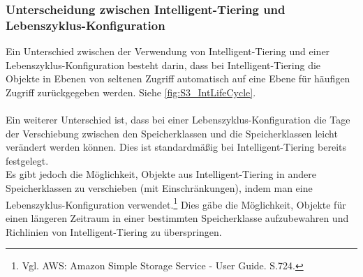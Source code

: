 \subsubsection*{Unterscheidung zwischen Intelligent-Tiering und Lebenszyklus-Konfiguration}%
Ein Unterschied zwischen der Verwendung von Intelligent-Tiering und einer Lebenszyklus-Konfiguration besteht darin, dass bei Intelligent-Tiering die Objekte in Ebenen von seltenen Zugriff automatisch auf eine Ebene für häufigen Zugriff zurückgegeben werden. Siehe \autoref{fig:S3_IntLifeCycle}.
\\\\
Ein weiterer Unterschied ist, dass bei einer Lebenszyklus-Konfiguration die Tage der Verschiebung zwischen den Speicherklassen und die Speicherklassen leicht verändert werden können. Dies ist standardmäßig bei Intelligent-Tiering bereits festgelegt. %
\\
Es gibt jedoch die Möglichkeit, Objekte aus Intelligent-Tiering in andere Speicherklassen zu verschieben (mit Einschränkungen), indem man eine Lebenszyklus-Konfiguration verwendet.\footnote{Vgl. AWS: Amazon Simple Storage Service - User Guide. S.724.\cite{AMZ18}} %
Dies gäbe die Möglichkeit, Objekte für einen längeren Zeitraum in einer bestimmten Speicherklasse aufzubewahren und Richlinien von Intelligent-Tiering zu überspringen.

